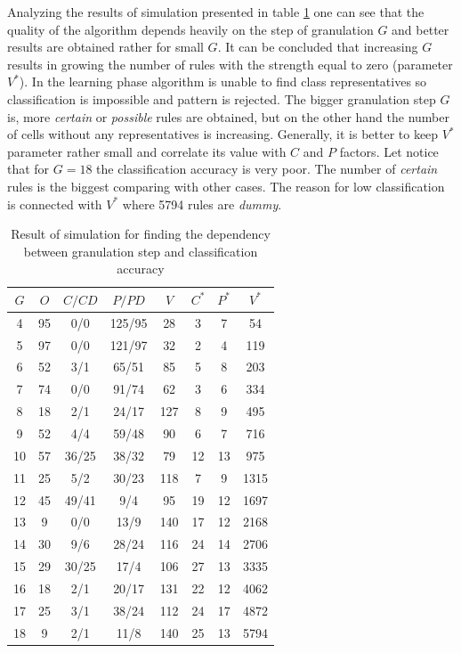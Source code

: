 Analyzing the results of simulation presented in table \ref{tab:simulation_research_1}
one can see that the quality of the algorithm depends heavily on the step of
granulation $G$ and better results are obtained rather for small $G$.
It can be concluded that increasing $G$ results in growing the number of rules
with the strength equal to zero (parameter $V^*$). In the learning phase
algorithm is unable to find class representatives so classification is 
impossible and pattern is rejected. The bigger granulation step $G$ is, more
\textit{certain} or \textit{possible} rules are obtained, but on the other hand
the number of cells without any representatives is increasing. Generally, it is
better to keep $V^*$ parameter rather small and correlate its value with $C$
and $P$ factors. Let notice that for $G=18$ the classification accuracy is very
poor. The number of \textit{certain} rules is the biggest comparing with other
cases. The reason for low classification is connected with $V^*$ where 5794
rules are \textit{dummy}.

\begin{table}[H]
    \caption{Result of simulation for finding the dependency between
    granulation step and classification accuracy}
    \centering
    \begin{tabular}{|c|c|c|c|c|c|c|c|}
        \hline
        $G$ & $O$ & $C/CD$ & $P/PD$ & $V$ & $C^*$ & $P^*$ & $V^*$ \\ \hline \hline
        4&95&0/0&125/95&28&3&7&54 \\ \hline
        5&97&0/0&121/97&32&2&4&119 \\\hline
        6&52&3/1&65/51&85&5&8&203 \\ \hline
        7&74&0/0&91/74&62&3&6&334 \\ \hline
        8&18&2/1&24/17&127&8&9&495 \\ \hline
        9&52&4/4&59/48&90&6&7&716 \\ \hline
        10&57&36/25&38/32&79&12&13&975 \\ \hline
        11&25&5/2&30/23&118&7&9&1315 \\ \hline
        12&45&49/41&9/4&95&19&12&1697 \\ \hline
        13&9&0/0&13/9&140&17&12&2168 \\ \hline
        14&30&9/6&28/24&116&24&14&2706 \\ \hline
        15&29&30/25&17/4&106&27&13&3335 \\ \hline
        16&18&2/1&20/17&131&22&12&4062 \\ \hline
        17&25&3/1&38/24&112&24&17&4872 \\ \hline
        18&9&2/1&11/8&140&25&13&5794 \\ \hline
    \end{tabular}
    \label{tab:simulation_research_1}
\end{table}


